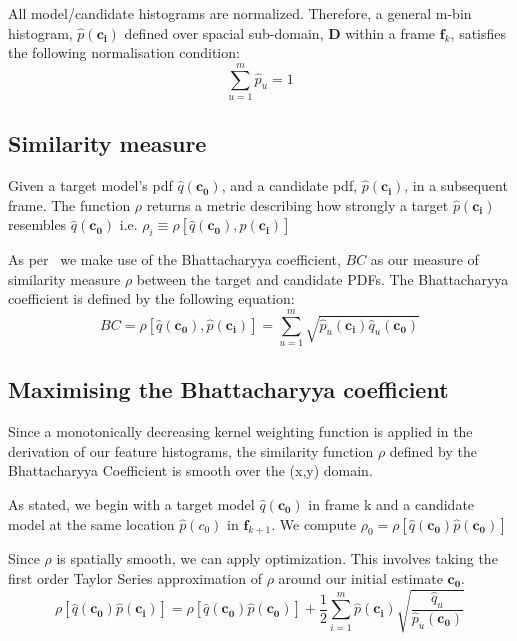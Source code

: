All model/candidate histograms are normalized. Therefore, a general m-bin
histogram, $\hat{p}(\mathbf{c_i})$ defined over spacial sub-domain, $\mathbf{D}$
within a frame $\mathbf{f}_k$, satisfies the following normalisation condition:
\[\sum_{u=1}^{m}\hat{p}_u = 1\]

\subsection{Similarity measure}
Given a target model's pdf $\hat{q}(\mathbf{c_0})$, and a candidate pdf,
$\hat{p}(\mathbf{c_i})$, in a subsequent frame.  The function $\rho$ returns a
metric describing how strongly a target $\hat{p}(\mathbf{c_i})$ resembles
$\hat{q}(\mathbf{c_0})$ i.e.
$\rho_i \equiv \rho[\hat{q}(\mathbf{c_0}),\hat{p}(\mathbf{c_i})]$

As per~\cite{Comaniciu2003} we make use of the Bhattacharyya coefficient, $BC$ as our
measure of similarity measure $\rho$ between the target and candidate PDFs. The
Bhattacharyya coefficient is defined by the following equation:
\begin{equation}\label{eqn:bhattacharyya}
    BC = \rho[\hat{q}(\mathbf{c_0}),\hat{p}(\mathbf{c_i})]=\sum_{u=1}^{m}\sqrt{\hat{p}_u(\mathbf{c_i})\hat{q}_u(\mathbf{c_0})}
\end{equation}

\subsection{Maximising the Bhattacharyya coefficient}\label{maximising_bhat}
Since a monotonically decreasing kernel weighting function is applied in the
derivation of our feature histograms, the similarity function $\rho$ defined by the
Bhattacharyya Coefficient is smooth over the (x,y) domain.

As stated, we begin with a target model $\hat{q}(\mathbf{c_0})$ in frame k and a candidate
model at the same location $\hat{p}(c_0)$ in $\mathbf{f}_{k+1}$. We compute
$\rho_0=\rho[\hat{q}(\mathbf{c_0})\hat{p}(\mathbf{c_0})]$ 

Since $\rho$ is spatially smooth, we can apply optimization. This involves
taking the first order Taylor Series approximation of $\rho$ around our initial
estimate $\mathbf{c_0}$. 
\begin{equation}\label{eqn:rho_taylor}
    \rho[\hat{q}(\mathbf{c_0})\hat{p}(\mathbf{c_i})]=\rho[\hat{q}(\mathbf{c_0})\hat{p}(\mathbf{c_0})]+\frac{1}{2}\sum_{i=1}^{m}\hat{p}(\mathbf{c_i})\sqrt{\frac{\hat{q}_u}{\hat{p}_u(\mathbf{c_0})}}
\end{equation}

